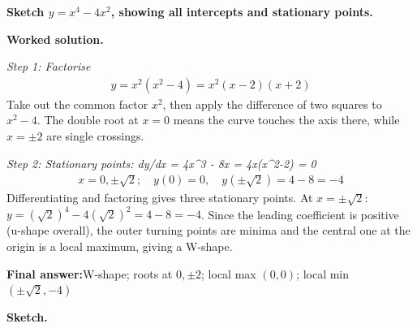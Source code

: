 \documentclass[11pt]{article}
\newcommand{\question}[1]{\par\medskip\noindent\textbf{#1}\par}
\begin{document}
\question{Sketch \( y = x^4 - 4x^2 \), showing all intercepts and stationary points.}

\textbf{Worked solution.}

\textit{Step 1: Factorise}
\[\begin{gathered}
y = x^2(x^2-4) = x^2(x-2)(x+2)
\end{gathered}\]
Take out the common factor \( x^2 \), then apply the difference of two squares to \( x^2 - 4 \). The double root at \( x = 0 \) means the curve touches the axis there, while \( x = \pm 2 \) are single crossings.

\textit{Step 2: Stationary points: dy/dx = 4x\textasciicircum 3 - 8x = 4x(x\textasciicircum 2-2) = 0}
\[\begin{gathered}
x = 0, \pm\sqrt{2}; \quad y(0) = 0, \quad y(\pm\sqrt{2}) = 4-8 = -4
\end{gathered}\]
Differentiating and factoring gives three stationary points. At \( x = \pm\sqrt{2} \): \( y = (\sqrt 2)^4 - 4(\sqrt 2)^2 = 4 - 8 = -4 \). Since the leading coefficient is positive (u-shape overall), the outer turning points are minima and the central one at the origin is a local maximum, giving a W-shape.

\begin{answerbox}
\textbf{Final answer:}\quad W-shape; roots at \(\displaystyle 0, \pm 2\); local max \(\displaystyle (0,0)\); local min \(\displaystyle (\pm\sqrt{2}, -4)\)
\end{answerbox}
\textbf{Sketch.}
\end{document}
